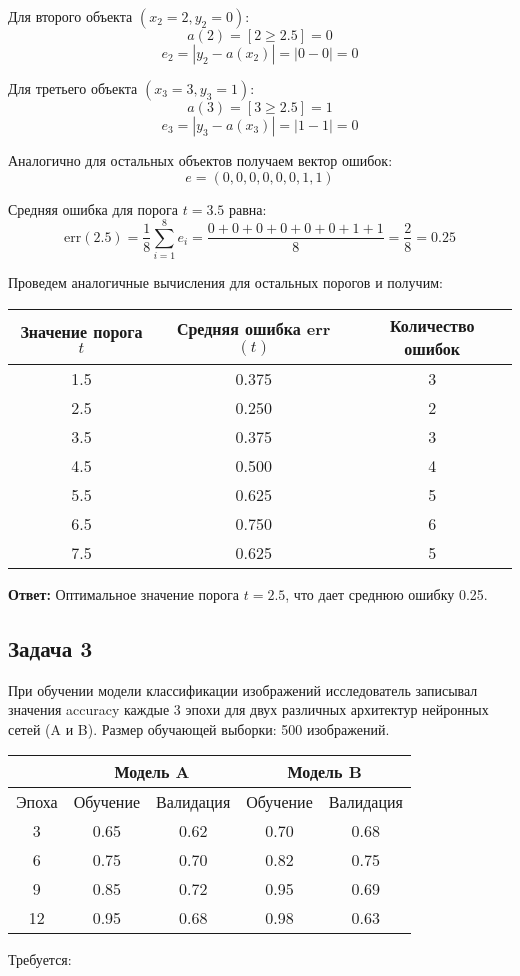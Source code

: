 Для второго объекта $(x_2 = 2, y_2 = 0)$:
$$a(2) = [2 \geq 2.5] = 0$$
$$e_2 = |y_2 - a(x_2)| = |0 - 0| = 0$$

Для третьего объекта $(x_3 = 3, y_3 = 1)$:
$$a(3) = [3 \geq 2.5] = 1$$
$$e_3 = |y_3 - a(x_3)| = |1 - 1| = 0$$

Аналогично для остальных объектов получаем вектор ошибок:
$$e = (0, 0, 0, 0, 0, 0, 1, 1)$$

Средняя ошибка для порога $t = 3.5$ равна:
$$\text{err}(2.5) = \frac{1}{8}\sum_{i=1}^8 e_i = \frac{0 + 0 + 0 + 0 + 0 + 0 + 1 + 1}{8} = \frac{2}{8} = 0.25$$

Проведем аналогичные вычисления для остальных порогов и получим:

\begin{center}
\begin{tabular}{|c|c|c|}
\hline
Значение порога $t$ & Средняя ошибка err$(t)$ & Количество ошибок \\
\hline
1.5 & 0.375 & 3 \\
2.5 & 0.250 & 2 \\
3.5 & 0.375 & 3 \\
4.5 & 0.500 & 4 \\
5.5 & 0.625 & 5 \\
6.5 & 0.750 & 6 \\
7.5 & 0.625 & 5 \\
\hline
\end{tabular}
\end{center}

\textbf{Ответ:} Оптимальное значение порога $t = 2.5$, что дает среднюю ошибку 0.25.

\subsection*{Задача 3}
При обучении модели классификации изображений исследователь записывал значения accuracy каждые 3 эпохи для двух различных архитектур нейронных сетей (A и B). Размер обучающей выборки: 500 изображений.
\begin{center}
\begin{tabular}{|c|c|c|c|c|}
\hline
& \multicolumn{2}{|c|}{Модель A} & \multicolumn{2}{|c|}{Модель B} \\
\hline
Эпоха & Обучение & Валидация & Обучение & Валидация \\
\hline
3 & 0.65 & 0.62 & 0.70 & 0.68 \\
6 & 0.75 & 0.70 & 0.82 & 0.75 \\
9 & 0.85 & 0.72 & 0.95 & 0.69 \\
12 & 0.95 & 0.68 & 0.98 & 0.63 \\
\hline
\end{tabular}
\end{center}
Требуется:

